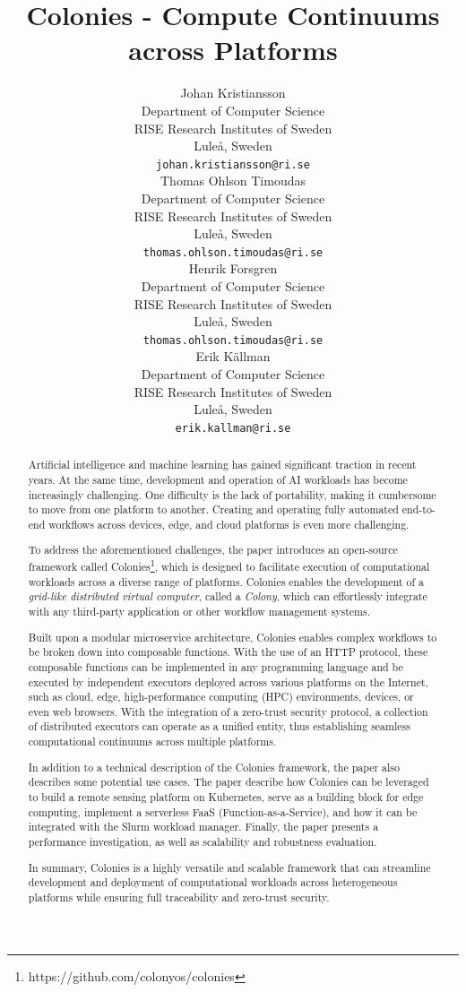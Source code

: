 \documentclass{article}
\title{Colonies - Compute Continuums across Platforms}
\author{{\hspace{1mm}Johan Kristiansson} \\
	Department of Computer Science \\
	RISE Research Institutes of Sweden \\
	Luleå, Sweden \\
	\texttt{johan.kristiansson@ri.se} \\
	\And
	{\hspace{1mm}Thomas Ohlson Timoudas} \\
	Department of Computer Science \\
	RISE Research Institutes of Sweden \\
	Luleå, Sweden \\
	\texttt{thomas.ohlson.timoudas@ri.se} \\
	\And
	{\hspace{1mm}Henrik Forsgren} \\
	Department of Computer Science \\
	RISE Research Institutes of Sweden \\
	Luleå, Sweden \\
	\texttt{thomas.ohlson.timoudas@ri.se} \\
	\And
	{\hspace{1mm}Erik Källman} \\
	Department of Computer Science \\
	RISE Research Institutes of Sweden \\
	Luleå, Sweden \\
	\texttt{erik.kallman@ri.se} \\
}
\begin{document}
\maketitle

\begin{abstract}
Artificial intelligence and machine learning has gained significant traction in recent years. At the same time, development and operation of AI workloads has become increasingly challenging. One difficulty is the lack of portability, making it cumbersome to move from one platform to another. Creating and operating fully automated end-to-end workflows across devices, edge, and cloud platforms is even more challenging.

To address the aforementioned challenges, the paper introduces an open-source framework called Colonies\footnote{https://github.com/colonyos/colonies}, which is designed to facilitate execution of computational workloads across a diverse range of platforms. Colonies enables the development of a \emph{grid-like distributed virtual computer}, called a \emph{Colony}, which can effortlessly integrate with any third-party application or other workflow management systems.

Built upon a modular microservice architecture, Colonies enables complex workflows to be broken down into composable functions. With the use of an HTTP protocol, these composable functions can be implemented in any programming language and be executed by independent executors deployed across various platforms on the Internet, such as cloud, edge, high-performance computing (HPC) environments, devices, or even web browsers. With the integration of a zero-trust security protocol, a collection of distributed executors can operate as a unified entity, thus establishing seamless computational continuums across multiple platforms.

In addition to a technical description of the Colonies framework, the paper also describes some potential use cases. The paper describe how Colonies can be leveraged to build a remote sensing platform on Kubernetes, serve as a building block for edge computing, implement a serverless FaaS (Function-as-a-Service), and how it can be integrated with the Slurm workload manager. Finally, the paper presents a performance investigation, as well as scalability and robustness evaluation. 

In summary, Colonies is a highly versatile and scalable framework that can streamline development and deployment of computational workloads across heterogeneous platforms while ensuring full traceability and zero-trust security.
\end{abstract}
\end{document}
